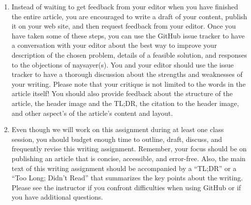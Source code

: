 \begin{enumerate}
  \item Instead of waiting to get feedback from your editor when you have finished the entire article, you are
    encouraged to write a draft of your content, publish it on your web site, and then request feedback from your
    editor. Once you have taken some of these steps, you can use the GitHub issue tracker to have a conversation with
    your editor about the best way to improve your description of the chosen problem, details of a feasible solution,
    and responses to the objections of naysayer(s). You and your editor should use the issue tracker to have a thorough
    discussion about the strengths and weaknesses of your writing. Please note that your critique is not limited to the
    words in the article itself! You should also provide feedback about the structure of the article, the header image
    and the TL;DR, the citation to the header image, and other aspect's of the article's content and layout.


  \item Even though we will work on this assignment during at least one class session, you should budget enough time to
    outline, draft, discuss, and frequently revise this writing assignment. Remember, your focus should be on publishing
    an article that is concise, accessible, and error-free. Also, the main text of this writing assignment should be
    accompanied by a ``TL;DR'' or a ``Too Long; Didn't Read'' that summarizes the key points about the writing. Please
    see the instructor if you confront difficulties when using GitHub or if you have additional questions.


\end{enumerate}

